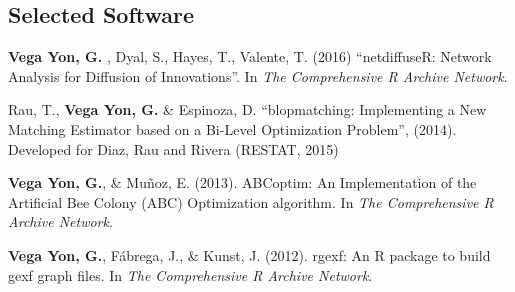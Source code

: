 \documentclass[letterpaper, 11pt]{article}
\renewenvironment{itemize}{
  \begin{list}{}{
    \setlength{\leftmargin}{0.45cm}
  }
}{
  \end{list}
}
\begin{document}
\subsection*{Selected Software}
\begin{itemize}
\item {\bf Vega Yon, G.} , Dyal, S., Hayes, T., Valente, T. (2016) ``netdiffuseR: Network Analysis for Diffusion of Innovations''. In {\it The Comprehensive R Archive Network}.
\item Rau, T., {\bf Vega Yon, G.} \& Espinoza, D. ``blopmatching: Implementing a New Matching Estimator based on a Bi-Level Optimization Problem'', (2014). Developed for Diaz, Rau and Rivera (RESTAT, 2015)
\item {\bf Vega Yon, G.}, \& Mu\~noz, E. (2013). ABCoptim: An Implementation of the Artificial Bee Colony (ABC) Optimization algorithm. In {\it The Comprehensive R Archive Network}.
\item {\bf Vega Yon, G.}, F\'abrega, J., \& Kunst, J. (2012). rgexf: An R package to build gexf graph files. In {\it The Comprehensive R Archive Network}.
\end{itemize}

%
\end{document}
